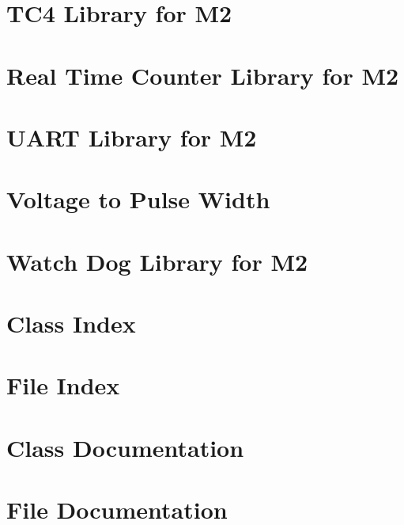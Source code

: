 \documentclass[twoside]{article}
\newcommand{\+}{\discretionary{\mbox{\scriptsize$\hookleftarrow$}}{}{}}
\newcommand{\clearemptydoublepage}{%
  \newpage{\pagestyle{empty}\cleardoublepage}%
}
\begin{document}
\section{T\+C4 Library for M2}
\label{a00156}

\section{Real Time Counter Library for M2}
\label{a00157}

\section{U\+A\+RT Library for M2}
\label{a00158}

\section{Voltage to Pulse Width}
\label{a00159}

\section{Watch Dog Library for M2}
\label{a00160}

\section{Class Index}

\section{File Index}

\section{Class Documentation}


\section{File Documentation}





















\newpage
{}
\clearemptydoublepage
{}
\printindex
\end{document}
